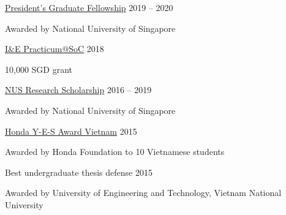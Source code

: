 
\begin{cvhonors}

\cvhonorr
    {\href{http://www.nus.edu.sg/admissions/graduate-studies/scholarships-financial-aid-and-fees/scholarships-awards/president's-graduate-fellowship.html}{President's Graduate Fellowship}} %
    {2019 -- 2020} %
    {
      \begin{cvitems} %
        \item {Awarded by National University of Singapore}
      \end{cvitems}
    }


\cvhonorr
    {\href{https://www.comp.nus.edu.sg/entrepreneurship/awards/winners/}{I\&E Practicum@SoC}} %
    {2018} %
    {
      \begin{cvitems} %
        \item {10,000 SGD grant}
      \end{cvitems}
    }

\cvhonorr
    {\href{http://www.nus.edu.sg/admissions/graduate-studies/scholarships-financial-aid-and-fees/scholarships-awards/nus-research-scholarship.html}{NUS Research Scholarship} } %
    {2016 -- 2019} %
    {
      \begin{cvitems} %
        \item {Awarded by National University of Singapore}
      \end{cvitems}
    }

  \cvhonorr
    {\href{http://www.hondafoundation.jp/yes/index_en/184}{Honda Y-E-S Award Vietnam}} %
    {2015} %
    {
    \begin{cvitems} %
        \item {Awarded by Honda Foundation to 10 Vietnamese students}
      \end{cvitems}
    }

  \cvhonorr
    {Best undergraduate thesis defense} %
    {2015} %
    {
    \begin{cvitems} %
        \item {Awarded by University of Engineering and Technology, Vietnam National University}
      \end{cvitems}
    }


\end{cvhonors}
